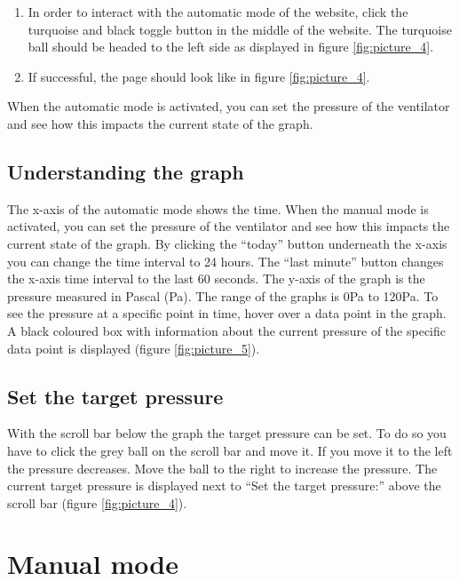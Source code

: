 \begin{enumerate}[wide,  labelwidth=0.3cm,  labelindent=0pt, leftmargin=0.5cm]
\item In order to interact with the automatic mode of the website, click the turquoise and black toggle button in the middle of the website. The turquoise ball should be headed to the left side as displayed in figure \ref{fig:picture_4}.
\item If successful, the page should look like in figure \ref{fig:picture_4}.
\end{enumerate}

When the automatic mode is activated, you can set the pressure of the ventilator and see how this
impacts the current state of the graph.

\subsection*{Understanding the graph}

The x-axis of the automatic mode shows the time. When the manual mode is activated, you can set the pressure of the ventilator and see how this impacts the current state of the graph. By clicking the “today” button underneath the x-axis you can change the time interval to 24 hours. The “last minute” button changes the x-axis time interval to the last 60 seconds. The y-axis of the graph is the pressure measured in Pascal (Pa). The range of the graphs is 0Pa to 120Pa. To see the pressure at a specific point in time, hover over a data point in the graph. A black coloured box with information about the current pressure of the specific data
point is displayed (figure \ref{fig:picture_5}).

\subsection*{Set the target pressure}

With the scroll bar below the graph the target pressure can be set. To do so you have to click the grey ball on the scroll bar and move it. If you move it to the left the pressure decreases. Move the ball to the right to increase the pressure. The current target pressure is displayed next to “Set the target pressure:” above the scroll bar (figure \ref{fig:picture_4}).



\section{Manual mode}
\label{sec:manual_mode}

